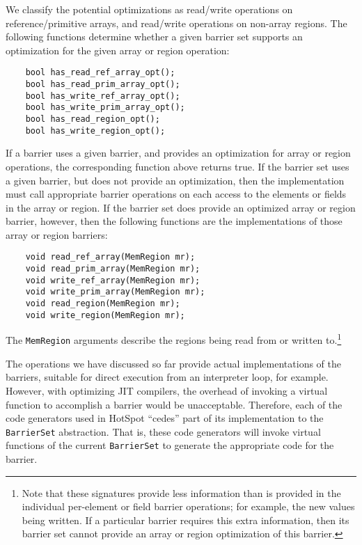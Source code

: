 \documentclass{article}
\begin{document}
We classify the potential optimizations as read/write operations on
reference/primitive arrays, and read/write operations on non-array
regions.  The following functions determine whether a given barrier
set supports an optimization for the given array or region operation:
\begin{verbatim}
    bool has_read_ref_array_opt();
    bool has_read_prim_array_opt();
    bool has_write_ref_array_opt();
    bool has_write_prim_array_opt();
    bool has_read_region_opt();
    bool has_write_region_opt();
\end{verbatim}
If a barrier uses a given barrier, and provides an optimization for
array or region operations, the corresponding
function  above returns true.  If the barrier set uses a given
barrier, but does not provide an optimization, then the implementation
must call appropriate barrier operations on each access to the
elements or fields in the array or region.  If the barrier set does
provide an optimized array or region barrier, however, then the
following functions are the implementations of those array or region
barriers:
\begin{verbatim}
    void read_ref_array(MemRegion mr);
    void read_prim_array(MemRegion mr);
    void write_ref_array(MemRegion mr);
    void write_prim_array(MemRegion mr);
    void read_region(MemRegion mr);
    void write_region(MemRegion mr);
\end{verbatim}
The {\tt MemRegion} arguments describe the regions being read from or
written to.\footnote{Note that these signatures provide less
information than is provided in the individual per-element or field
barrier operations; for example, the new values being written.  If a
particular barrier requires this extra information, then its barrier
set cannot provide an array or region optimization of this barrier.}

The operations we have discussed so far provide actual implementations
of the barriers, suitable for direct execution from an interpreter
loop, for example.  However, with optimizing JIT compilers, the
overhead of invoking a virtual function to accomplish a barrier would
be unacceptable.  Therefore, each of the code generators used in
HotSpot ``cedes'' part of its implementation to the {\tt BarrierSet}
abstraction.  That is, these code generators will invoke virtual
functions of the current {\tt BarrierSet} to generate the appropriate
code for the barrier.

\end{document}

